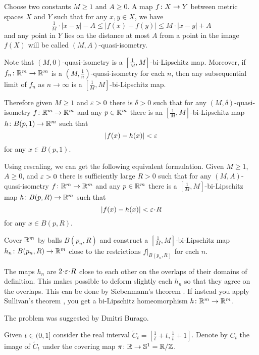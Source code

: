 Choose two constants $M\ge 1$ and $A\ge 0$.
A map $f\:X\z\to Y$ between metric spaces $X$ and $Y$ such that for any $x,y\in X$,
 we have
\[\tfrac1M\cdot |x-y|-A\le |f(x)-f(y)|\le M\cdot |x-y|+A\]
and any point in $Y$ lies on the distance at most $A$ from a point in the image $f(X)$
will be called $(M,A)$-quasi-isometry.

{\sloppy
Note that $(M,0)$-quasi-isometry is a $[\tfrac1M,M]$-bi-Lipschitz map.
Moreover,
if $f_n\colon\mathbb{R}^m\to\mathbb{R}^m$ is a  $(M,\frac1n)$-quasi-isometry 
for each $n$, 
then any subsequential limit of $f_n$ as $n\to\infty$
is a $[\tfrac1M,M]$-bi-Lipschitz map.

}

Therefore given $M\ge 1$ and $\varepsilon>0$ there is $\delta>0$ such that 
for any $(M,\delta)$-quasi-isometry $f\colon\mathbb{R}^m\to\mathbb{R}^m$ and any $p\in \mathbb{R}^m$
there is an $[\tfrac1M,M]$-bi-Lipschitz map $h\colon B(p,1)\to \mathbb{R}^m$
such that
\[|f(x)-h(x)|<\varepsilon\]
for any $x\in B(p,1)$.

Using rescaling, we can get the following equivalent formulation. 
Given $M\ge 1$, $A\ge 0$, and $\varepsilon>0$
there is sufficiently large $R>0$ such that for any $(M,A)$-quasi-isometry 
$f\colon\mathbb{R}^m\to\mathbb{R}^m$ and any $p\in\mathbb{R}^m$ there is a $[\tfrac1M,M]$-bi-Lipschitz map $h\colon B(p,R)\to \mathbb{R}^m$
such that 
\[|f(x)-h(x)|<\eps\cdot R\]
for any $x\in B(p,R)$.

Cover $\mathbb{R}^m$ by balls $B(p_n,R)$ and construct a $[\tfrac1M,M]$-bi-Lipschitz map $h_n\colon B(p_n,R)\to \mathbb{R}^m$ close to the restrictions $f|_{B(p_n,R)}$ for each $n$.

The maps $h_n$ are $2\cdot \eps\cdot R$ close to each other on the overlaps of their domains of definition.
This makes possible to deform slightly each $h_n$ so that they agree on the overlaps.
This can be done by Siebenmann's theorem \cite{siebenmann}.
If instead you apply Sullivan's theorem \cite{sullivan}, you get a bi-Lipschitz homeomorphism $h\:\RR^m\z\to\RR^m$.\qeds


The problem was suggested by Dmitri Burago.





Given $t\in (0,1]$ consider the real interval $\tilde C_t=[\tfrac 1t+t, \tfrac 1t+1]$.
Denote by $C_t$ the image of $\tilde C_t$ under the covering map $\pi\colon\mathbb{R}\to \mathbb{S}^1=\mathbb{R}/\mathbb{Z}$.

